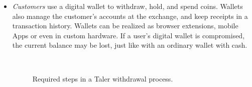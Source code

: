 \documentclass{llncs}
\begin{document}
\begin{itemize}
\item
{\em Customers} use a digital wallet to withdraw,
hold, and spend coins. Wallets also manage the customer's accounts
at the exchange, and keep receipts in a transaction history.  Wallets can be
realized as browser extensions, mobile Apps or even in custom
hardware.  If a user's digital wallet is compromised, the current
balance may be lost, just like with an ordinary wallet with cash.


\begin{figure}[t!]%
 \hfill
{} \\
 \hfill
{}
\caption{Required steps in a Taler withdrawal process.}
\label{fig:withdrawal}
\end{figure}




\end{itemize}
\end{document}
